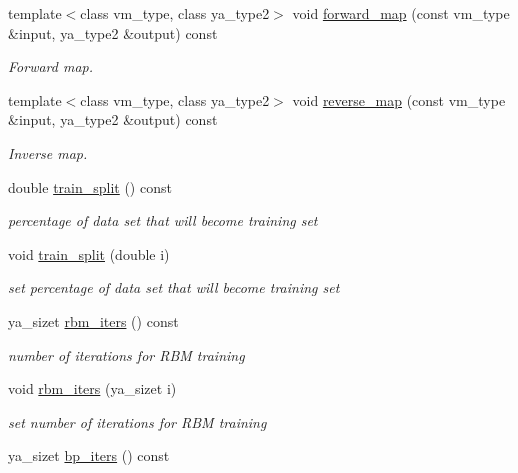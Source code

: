 \begin{CompactItemize}
template$<$class vm\_\-type, class ya\_\-type2$>$ void \hyperlink{class_y_a_a_t_e_reduce_a14}{forward\_\-map} (const vm\_\-type \&input, ya\_\-type2 \&output) const 
\begin{CompactList}\small\item\em Forward map. \item\end{CompactList}\item 
template$<$class vm\_\-type, class ya\_\-type2$>$ void \hyperlink{class_y_a_a_t_e_reduce_a15}{reverse\_\-map} (const vm\_\-type \&input, ya\_\-type2 \&output) const 
\begin{CompactList}\small\item\em Inverse map. \item\end{CompactList}\item 
\hypertarget{class_y_a_a_t_e_reduce_a16}{
double \hyperlink{class_y_a_a_t_e_reduce_a16}{train\_\-split} () const }
\label{class_y_a_a_t_e_reduce_a16}

\begin{CompactList}\small\item\em percentage of data set that will become training set \item\end{CompactList}\item 
\hypertarget{class_y_a_a_t_e_reduce_a17}{
void \hyperlink{class_y_a_a_t_e_reduce_a17}{train\_\-split} (double i)}
\label{class_y_a_a_t_e_reduce_a17}

\begin{CompactList}\small\item\em set percentage of data set that will become training set \item\end{CompactList}\item 
\hypertarget{class_y_a_a_t_e_reduce_a18}{
ya\_\-sizet \hyperlink{class_y_a_a_t_e_reduce_a18}{rbm\_\-iters} () const }
\label{class_y_a_a_t_e_reduce_a18}

\begin{CompactList}\small\item\em number of iterations for RBM training \item\end{CompactList}\item 
\hypertarget{class_y_a_a_t_e_reduce_a19}{
void \hyperlink{class_y_a_a_t_e_reduce_a19}{rbm\_\-iters} (ya\_\-sizet i)}
\label{class_y_a_a_t_e_reduce_a19}

\begin{CompactList}\small\item\em set number of iterations for RBM training \item\end{CompactList}\item 
\hypertarget{class_y_a_a_t_e_reduce_a20}{
ya\_\-sizet \hyperlink{class_y_a_a_t_e_reduce_a20}{bp\_\-iters} () const }
\label{class_y_a_a_t_e_reduce_a20}


\end{CompactItemize}
